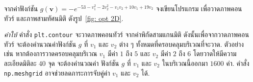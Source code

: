 \begin{Exercise}
	\label{ex: opt loss 2D plot}
	
	จากค่าฟังก์ชัน $g(\bm{v}) = -e^{-53-v_1^2 -2v_2^2-v_1 v_2 + 10 v_1 + 19 v_2}$
	จงเขียนโปรแกรม 
	เพื่อวาดภาพคอนทัวร์
	และภาพสามทัศนมิติ ดังรูป~\ref{fig: opt 2D}.
	
	\textit{คำใบ้}
	คำสั่ง \verb|plt.contour| จะวาดภาพคอนทัวร์
	จากค่าพิกัดสามแกนมิติ 
	ดังนั้นเพื่อจากวาดภาพคอนทัวร์
	จะต้องคำนวณค่าฟังก์ชัน $g$ ที่ $v_1$ และ $v_2$ ต่าง ๆ ทั้งหมดที่ครอบคลุมบริเวณที่จะวาด.
	ตัวอย่าง เช่น หากต้องการวาดครอบคลุมบริเวณ $v_1$ มีค่า $1$ ถึง $5$ และ $v_2$ มีค่า $2$ ถึง $6$ โดยวาดให้มีความละเอียดมิติละ $40$ จุด
	จะต้องคำนวณค่า ฟังก์ชัน $g$ ที่ $v_1$ และ $v_2$ ในบริเวณนี้ออกมา $1600$ ค่า.
	คำสั่ง \verb|np.meshgrid| อาจช่วยลดภาระการจับคู่ค่า $v_1$ และ $v_2$ ได้.
	
\end{Exercise}



